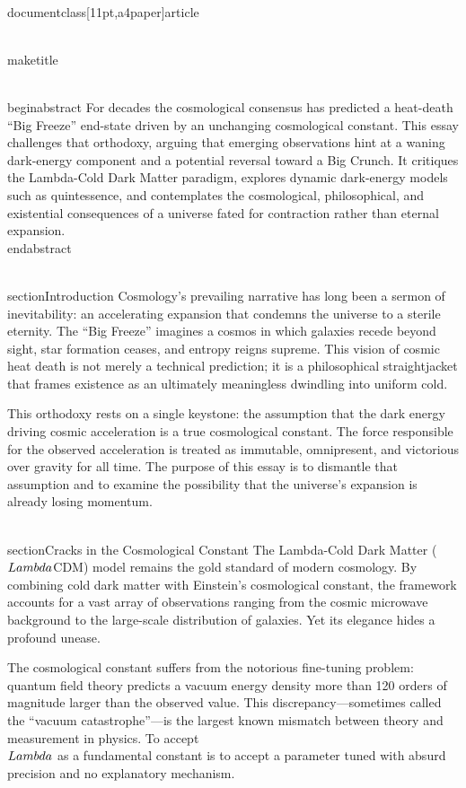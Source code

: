 \\documentclass[11pt,a4paper]{article}
\begin{document}
\\maketitle

\\begin{abstract}
For decades the cosmological consensus has predicted a heat-death ``Big Freeze'' end-state driven by an unchanging cosmological constant. This essay challenges that orthodoxy, arguing that emerging observations hint at a waning dark-energy component and a potential reversal toward a Big Crunch. It critiques the Lambda-Cold Dark Matter paradigm, explores dynamic dark-energy models such as quintessence, and contemplates the cosmological, philosophical, and existential consequences of a universe fated for contraction rather than eternal expansion.
\\end{abstract}

\\section{Introduction}
Cosmology's prevailing narrative has long been a sermon of inevitability: an accelerating expansion that condemns the universe to a sterile eternity. The ``Big Freeze'' imagines a cosmos in which galaxies recede beyond sight, star formation ceases, and entropy reigns supreme. This vision of cosmic heat death is not merely a technical prediction; it is a philosophical straightjacket that frames existence as an ultimately meaningless dwindling into uniform cold.

This orthodoxy rests on a single keystone: the assumption that the dark energy driving cosmic acceleration is a true cosmological constant. The force responsible for the observed acceleration is treated as immutable, omnipresent, and victorious over gravity for all time. The purpose of this essay is to dismantle that assumption and to examine the possibility that the universe's expansion is already losing momentum.

\\section{Cracks in the Cosmological Constant}
The Lambda-Cold Dark Matter (\\$\\Lambda\\$CDM) model remains the gold standard of modern cosmology. By combining cold dark matter with Einstein's cosmological constant, the framework accounts for a vast array of observations ranging from the cosmic microwave background to the large-scale distribution of galaxies. Yet its elegance hides a profound unease.

The cosmological constant suffers from the notorious fine-tuning problem: quantum field theory predicts a vacuum energy density more than 120 orders of magnitude larger than the observed value. This discrepancy---sometimes called the ``vacuum catastrophe''---is the largest known mismatch between theory and measurement in physics. To accept \\$\\Lambda\\$ as a fundamental constant is to accept a parameter tuned with absurd precision and no explanatory mechanism.
\end{document}

